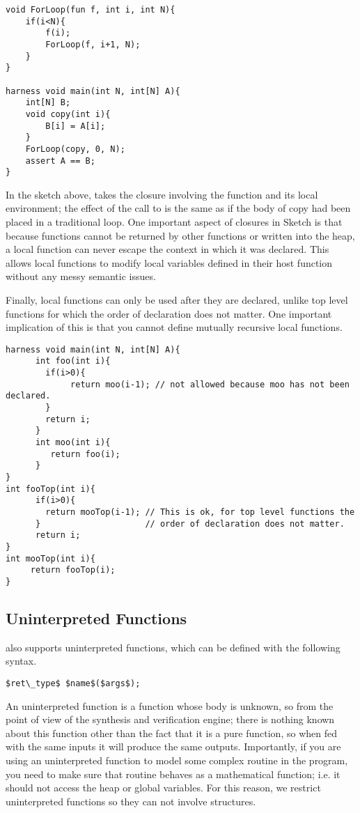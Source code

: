 \begin{lstlisting}
void ForLoop(fun f, int i, int N){
	if(i<N){
		f(i);
		ForLoop(f, i+1, N);
	}
}

harness void main(int N, int[N] A){
	int[N] B;
	void copy(int i){
		B[i] = A[i];
	}
	ForLoop(copy, 0, N);
	assert A == B;
}
\end{lstlisting}
	
In the sketch above,  takes the closure involving the function  and its local environment; the effect of the call to  is the same as if the body of copy had been placed in a traditional  loop. 
One important aspect of closures in Sketch is that because functions cannot be returned by other functions or written into the heap, a local function can never escape the context in which it was declared. This allows local functions to modify local variables defined in their host function without any messy semantic issues.

Finally, local functions can only be used after they are declared, unlike top level functions for which the order of declaration does not matter. One important implication of this is that you cannot define mutually recursive local functions.

\begin{lstlisting}
harness void main(int N, int[N] A){
      int foo(int i){
        if(i>0){
             return moo(i-1); // not allowed because moo has not been declared.
        }
        return i;
      }
      int moo(int i){
         return foo(i);
      }
}
int fooTop(int i){
      if(i>0){
        return mooTop(i-1); // This is ok, for top level functions the 
      }                     // order of declaration does not matter.
      return i;
}
int mooTop(int i){
     return fooTop(i);
}
\end{lstlisting}



\subsection{Uninterpreted Functions}
\Sk{} also supports uninterpreted functions, which can be defined with the following syntax.
\begin{lstlisting}
$ret\_type$ $name$($args$);
\end{lstlisting}
An uninterpreted function is a function whose body is unknown, so from the point of view of the synthesis and verification engine; there is nothing known about this function other than the fact that it is a pure function, so when fed with the same inputs it will produce the same outputs. Importantly, if you are using an uninterpreted function to model some complex routine in the program, you need to make sure that routine behaves as a mathematical function; i.e. it should not access the heap or global variables. For this reason, we restrict uninterpreted functions so they can not involve structures.


